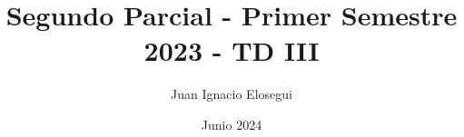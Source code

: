 \documentclass[12pt]{article}
\begin{document}
	\title{Segundo Parcial - Primer Semestre 2023 - TD III}
	\author{Juan Ignacio Elosegui}
	\date{Junio 2024}
	\maketitle                   
	
\end{document}
